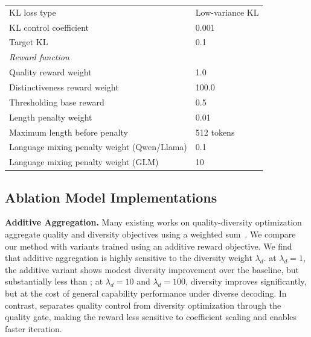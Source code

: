 \begin{table}[t]
\begin{tabular}{ll}
KL loss type & Low-variance KL \\
KL control coefficient & 0.001 \\
Target KL & 0.1 \\
\midrule
\multicolumn{2}{l}{\textit{Reward function}} \\
Quality reward weight & 1.0 \\
Distinctiveness reward weight & 100.0 \\
Thresholding base reward & 0.5 \\
Length penalty weight & 0.01 \\
Maximum length before penalty & 512 tokens \\
Language mixing penalty weight (Qwen/Llama) & 0.1 \\
Language mixing penalty weight (GLM) & 10 \\
\bottomrule
\end{tabular}
\label{tab:hyperparameter}
\end{table}

\subsection{Ablation Model Implementations}
\label{appx: ablation model implementations}

\textbf{Additive Aggregation.}\label{ablation: additive aggregation} Many existing works on quality-diversity optimization aggregate quality and diversity objectives using a weighted sum~\citep{mouret2015illuminatingsearchspacesmapping, Chen2025PosttrainingLL}. We compare our method with variants trained using an additive reward objective. We find that additive aggregation is highly sensitive to the diversity weight $\lambda_d$. at $\lambda_d=1$, the additive variant shows modest diversity improvement over the baseline, but substantially less than \method{}; at $\lambda_d=10$ and $\lambda_d=100$, diversity improves significantly, but at the cost of general capability performance under diverse decoding. In contrast, \method{} separates quality control from diversity optimization through the quality gate, making the reward less sensitive to coefficient scaling and enables faster iteration.

